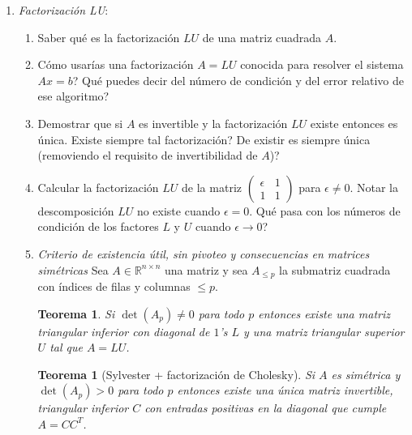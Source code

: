 \documentclass[12pt]{amsart}
\newtheorem{theorem}[lemma]{Teorema}
\theoremstyle{definition}
\renewcommand{\leq}{\leqslant}
\newcommand{\RR}{\ensuremath{\mathbb{R}}}
\begin{document}
\begin{enumerate}
\begin{enumerate}
\begin{enumerate}
\item \begin{theorem} Resolver un sistema lineal triangular inferior mediante sustitución hacia atrás es backward-stable.
\end{theorem} 
Saber la demostración para sistemas $2\times 2$ (la idea en general es la misma y solo requiere más cálculos)

\end{enumerate}


\end{enumerate}
\item \emph{Factorización LU}:
\begin{enumerate}
\item Saber qué es la factorización $LU$ de una matriz cuadrada $A$.
\item Cómo usarías una factorización $A=LU$ conocida para resolver el sistema $Ax=b$? Qué puedes decir del número de condición y del error relativo de ese algoritmo?
\item Demostrar que si $A$ es invertible y la factorización $LU$ existe entonces es única. Existe siempre tal factorización? De existir es siempre única (removiendo el requisito de invertibilidad de $A$)?

\item Calcular la factorización $LU$ de la matriz 
$\begin{pmatrix}
\epsilon & 1 \\
1 & 1
\end{pmatrix}$
para $\epsilon\neq 0$. Notar la descomposición $LU$ no existe cuando $\epsilon=0$. Qué pasa con los números de condición de los factores $L$ y $U$ cuando $\epsilon\rightarrow 0$?


\item \emph{Criterio de existencia útil, sin pivoteo y consecuencias en matrices simétricas} Sea $A\in \RR^{n\times n}$ una matriz y sea $A_{\leq p}$ la submatriz cuadrada con índices de filas y columnas $\leq p$.

\begin{theorem} Si $\det(A_p)\neq 0$ para todo $p$ entonces existe una matriz triangular inferior con diagonal de $1$'s $L$ y una matriz triangular superior $U$ tal que $A=LU$.
\end{theorem}

\begin{theorem} [Sylvester + factorización de Cholesky] Si $A$ es simétrica y $\det(A_p)>0$ para todo $p$ entonces existe una única matriz invertible, triangular inferior $C$ con entradas positivas en la diagonal que cumple $A=CC^T$.
\end{theorem}


\end{enumerate}
\end{enumerate}
\end{document}
